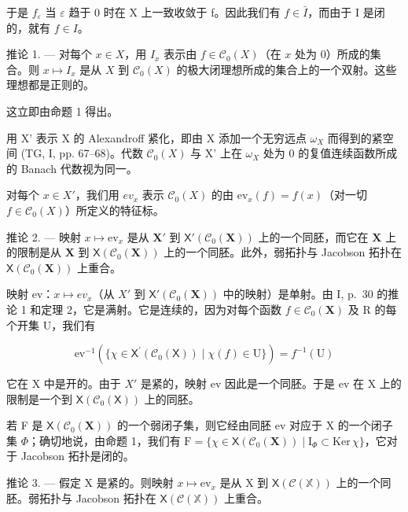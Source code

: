 于是 \(f_{\varepsilon}\) 当 \(\varepsilon\) 趋于 0 时在 X 上一致收敛于 f。因此我们有 \(f \in \bar{I}\)，而由于 I 是闭的，就有 \(f \in I\)。

推论 1. --- 对每个 \(x \in X\)，用 \(I_x\) 表示由 \(f \in \mathcal{C}_0(X)\)（在 \(x\) 处为 0）所成的集合。则 \(x \mapsto I_x\) 是从 \(X\) 到 \(\mathcal{C}_0(X)\) 的极大闭理想所成的集合上的一个双射。这些理想都是正则的。

这立即由命题 1 得出。

用 X' 表示 X 的 Alexandroff 紧化，即由 X 添加一个无穷远点 \(\omega_{X}\) 而得到的紧空间 (TG, I, pp. 67–68)。代数 \(\mathcal{C}_{0}(X)\) 与 X' 上在 \(\omega_{X}\) 处为 0 的复值连续函数所成的 Banach 代数视为同一。

对每个 \(x \in X'\)，我们用 \(ev_{x}\) 表示 \(\mathcal{C}_{0}(X)\) 的由 \(\mathrm{ev}_{x}(f) = f(x)\)（对一切 \(f \in \mathcal{C}_{0}(X)\)）所定义的特征标。

推论 2. --- 映射 \(x \mapsto \mathrm{ev}_x\) 是从 \(\mathbf{X}'\) 到 \(\mathsf{X}'(\mathcal{C}_0(\mathbf{X}))\) 上的一个同胚，而它在 \(\mathbf{X}\) 上的限制是从 \(\mathbf{X}\) 到 \(\mathsf{X}(\mathcal{C}_0(\mathbf{X}))\) 上的一个同胚。此外，弱拓扑与 Jacobson 拓扑在 \(\mathsf{X}(\mathcal{C}_0(\mathbf{X}))\) 上重合。

映射 ev：\(x \mapsto ev_{x}\)（从 \(X'\) 到 \(\mathsf{X}'(\mathcal{C}_{0}(\mathbf{X}))\) 中的映射）是单射。由 I, p.~30 的推论 1 和定理 2，它是满射。它是连续的，因为对每个函数 \(f \in \mathcal{C}_{0}(\mathbf{X})\) 及 R 的每个开集 U，我们有

\[
\mathrm{ev} ^ {- 1} (\{\chi \in \mathsf {X} ^ {\prime} (\mathcal {C} _ {0} (\mathsf {X})) \mid \chi (f) \in \mathrm{U} \}) = f ^ {- 1} (\mathrm{U})
\]

它在 X 中是开的。由于 \(X'\) 是紧的，映射 ev 因此是一个同胚。于是 ev 在 X 上的限制是一个到 \(\mathsf{X}(\mathcal{C}_{0}(\mathsf{X}))\) 上的同胚。

若 F 是 \(\mathsf{X}(\mathcal{C}_{0}(\mathbf{X}))\) 的一个弱闭子集，则它经由同胚 ev 对应于 X 的一个闭子集 \(\Phi\)；确切地说，由命题 1，我们有 \(\mathrm{F} = \{\chi \in \mathsf{X}(\mathcal{C}_{0}(\mathbf{X})) \mid \mathrm{I}_{\Phi} \subset \mathrm{Ker} \, \chi\}\)，它对于 Jacobson 拓扑是闭的。

推论 3. --- 假定 X 是紧的。则映射 \(x \mapsto \mathrm{ev}_x\) 是从 X 到 \(\mathsf{X}(\mathcal{C}(\mathbb{X}))\) 上的一个同胚。弱拓扑与 Jacobson 拓扑在 \(\mathsf{X}(\mathcal{C}(\mathbb{X}))\) 上重合。
